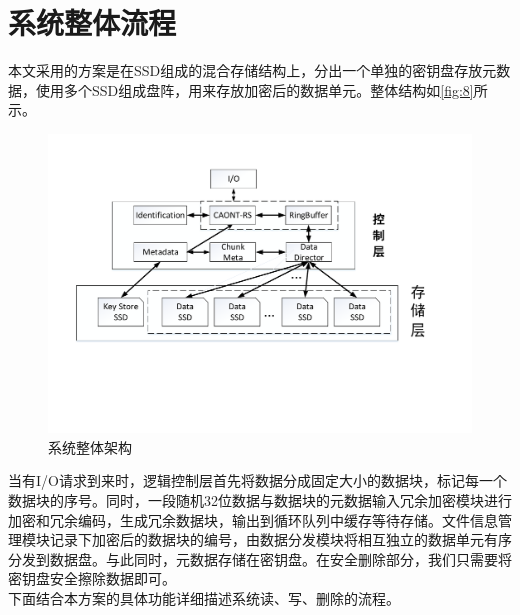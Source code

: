 \section{系统整体流程}
本文采用的方案是在SSD组成的混合存储结构上，分出一个单独的密钥盘存放元数据，使用多个SSD组成盘阵，用来存放加密后的数据单元。整体结构如\autoref{fig:8}所示。
\begin{figure}[H]
	\centering
	\includegraphics[width=1\textwidth]{Pics/total-store-structure.pdf}
	\caption{系统整体架构}\label{fig:8}
\end{figure}
当有I/O请求到来时，逻辑控制层首先将数据分成固定大小的数据块，标记每一个数据块的序号。同时，一段随机32位数据与数据块的元数据输入冗余加密模块进行加密和冗余编码，生成冗余数据块，输出到循环队列中缓存等待存储。文件信息管理模块记录下加密后的数据块的编号，由数据分发模块将相互独立的数据单元有序分发到数据盘。与此同时，元数据存储在密钥盘。在安全删除部分，我们只需要将密钥盘安全擦除数据即可。\\
下面结合本方案的具体功能详细描述系统读、写、删除的流程。

